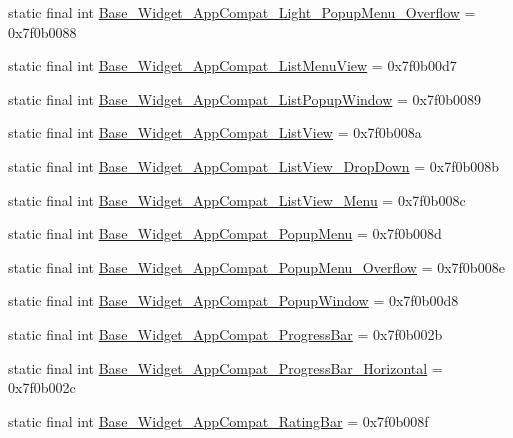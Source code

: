 \begin{CompactItemize}
\item 
static final int \hyperlink{classandroid_1_1support_1_1v7_1_1cardview_1_1_r_1_1style_43704843fba1b35b6e3d4d4e196fb140}{Base\_\-Widget\_\-AppCompat\_\-Light\_\-PopupMenu\_\-Overflow} = 0x7f0b0088
\item 
static final int \hyperlink{classandroid_1_1support_1_1v7_1_1cardview_1_1_r_1_1style_98f75ee339cb859605acc607a1bb432d}{Base\_\-Widget\_\-AppCompat\_\-ListMenuView} = 0x7f0b00d7
\item 
static final int \hyperlink{classandroid_1_1support_1_1v7_1_1cardview_1_1_r_1_1style_90d7c231dc66120053eff866d285bebb}{Base\_\-Widget\_\-AppCompat\_\-ListPopupWindow} = 0x7f0b0089
\item 
static final int \hyperlink{classandroid_1_1support_1_1v7_1_1cardview_1_1_r_1_1style_b6aeec65382350c59d65b3270ff2562f}{Base\_\-Widget\_\-AppCompat\_\-ListView} = 0x7f0b008a
\item 
static final int \hyperlink{classandroid_1_1support_1_1v7_1_1cardview_1_1_r_1_1style_21fe02941fd8647c5f9e1efa27fa1ed1}{Base\_\-Widget\_\-AppCompat\_\-ListView\_\-DropDown} = 0x7f0b008b
\item 
static final int \hyperlink{classandroid_1_1support_1_1v7_1_1cardview_1_1_r_1_1style_8fca69d81ec9b0bb0b25279efdac7562}{Base\_\-Widget\_\-AppCompat\_\-ListView\_\-Menu} = 0x7f0b008c
\item 
static final int \hyperlink{classandroid_1_1support_1_1v7_1_1cardview_1_1_r_1_1style_d92027c01507f4da5a9ff1bb26f614d8}{Base\_\-Widget\_\-AppCompat\_\-PopupMenu} = 0x7f0b008d
\item 
static final int \hyperlink{classandroid_1_1support_1_1v7_1_1cardview_1_1_r_1_1style_41df4a33b0050240b294fff8bd433970}{Base\_\-Widget\_\-AppCompat\_\-PopupMenu\_\-Overflow} = 0x7f0b008e
\item 
static final int \hyperlink{classandroid_1_1support_1_1v7_1_1cardview_1_1_r_1_1style_97cda16262803cdd10ade4dd0581a9b3}{Base\_\-Widget\_\-AppCompat\_\-PopupWindow} = 0x7f0b00d8
\item 
static final int \hyperlink{classandroid_1_1support_1_1v7_1_1cardview_1_1_r_1_1style_97f212ecce95ee5c6bc04dd12486e4a6}{Base\_\-Widget\_\-AppCompat\_\-ProgressBar} = 0x7f0b002b
\item 
static final int \hyperlink{classandroid_1_1support_1_1v7_1_1cardview_1_1_r_1_1style_e89aaf48434cf0eb592cf8cd8cb944c8}{Base\_\-Widget\_\-AppCompat\_\-ProgressBar\_\-Horizontal} = 0x7f0b002c
\item 
static final int \hyperlink{classandroid_1_1support_1_1v7_1_1cardview_1_1_r_1_1style_84cd4719c104d4f068a8dbd587420c8c}{Base\_\-Widget\_\-AppCompat\_\-RatingBar} = 0x7f0b008f

\end{CompactItemize}
